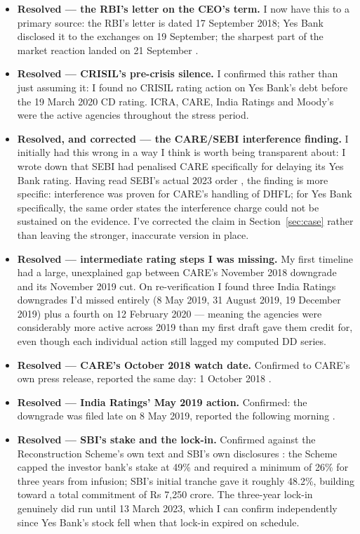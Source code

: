 \begin{itemize}
\item \textbf{Resolved --- the RBI's letter on the CEO's term.} I now have this to a primary source: the RBI's letter is dated 17 September 2018; Yes Bank disclosed it to the exchanges on 19 September; the sharpest part of the market reaction landed on 21 September \cite{bsSep19disc,bsSep21fall}.
\item \textbf{Resolved --- CRISIL's pre-crisis silence.} I confirmed this rather than just assuming it: I found no CRISIL rating action on Yes Bank's debt before the 19 March 2020 CD rating. ICRA, CARE, India Ratings and Moody's were the active agencies throughout the stress period.
\item \textbf{Resolved, and corrected --- the CARE/SEBI interference finding.} I initially had this wrong in a way I think is worth being transparent about: I wrote down that SEBI had penalised CARE specifically for delaying its Yes Bank rating. Having read SEBI's actual 2023 order \cite{sebiCareOrder}, the finding is more specific: interference was proven for CARE's handling of DHFL; for Yes Bank specifically, the same order states the interference charge could not be sustained on the evidence. I've corrected the claim in Section~\ref{sec:case} rather than leaving the stronger, inaccurate version in place.
\item \textbf{Resolved --- intermediate rating steps I was missing.} My first timeline had a large, unexplained gap between CARE's November 2018 downgrade and its November 2019 cut. On re-verification I found three India Ratings downgrades I'd missed entirely (8 May 2019, 31 August 2019, 19 December 2019) plus a fourth on 12 February 2020 — meaning the agencies were considerably more active across 2019 than my first draft gave them credit for, even though each individual action still lagged my computed DD series.
\item \textbf{Resolved --- CARE's October 2018 watch date.} Confirmed to CARE's own press release, reported the same day: 1 October 2018 \cite{bsCareOct1}.
\item \textbf{Resolved --- India Ratings' May 2019 action.} Confirmed: the downgrade was filed late on 8 May 2019, reported the following morning \cite{bsIndraMay19}.
\item \textbf{Resolved --- SBI's stake and the lock-in.} Confirmed against the Reconstruction Scheme's own text \cite{yesReconScheme} and SBI's own disclosures \cite{sbiStakeScheme}: the Scheme capped the investor bank's stake at 49\% and required a minimum of 26\% for three years from infusion; SBI's initial tranche gave it roughly 48.2\%, building toward a total commitment of Rs 7,250 crore. The three-year lock-in genuinely did run until 13 March 2023, which I can confirm independently since Yes Bank's stock fell when that lock-in expired on schedule.

\end{itemize}
